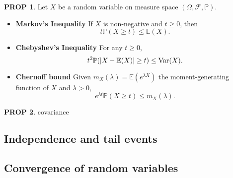 \documentclass[hidelinks,11pt]{article}
\theoremstyle{definition}
\theoremstyle{dotless}
\newtheorem{prop}{PROP}[section]
\theoremstyle{remark}
\DeclareMathOperator{\Var}{Var}
\begin{document}
\begin{prop}\label{Prop 2.2}
Let $X$ be a random variable on measure space $(\Omega,\mathcal{F},\mathbb{P})$.
\begin{itemize}
    \item \textup{\textbf{Markov's Inequality}} If $X$ is non-negative and $t\geq0$, then
    \[t\mathbb{P}(X\geq t)\leq\mathbb{E}(X).\]
    \item \textup{\textbf{Chebyshev's Inequality}} For any $t\geq0$,
    \[t^2\mathbb{P}(\abs{X-\mathbb{E}(X)}\geq t)\leq\Var(X).\]
    \item \textup{\textbf{Chernoff bound}} Given $m_X(\lambda)=\mathbb{E}(e^{\lambda X})$ the moment-generating function of $X$ and $\lambda>0$,
    \[e^{\lambda t}\mathbb{P}(X\geq t)\leq m_X(\lambda).\]
\end{itemize}
\end{prop}

\begin{prop}
covariance
\end{prop}

\subsection{Independence and tail events}

\subsection{Convergence of random variables}
\end{document}
